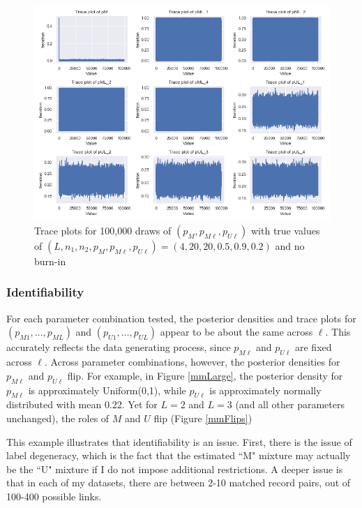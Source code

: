 \documentclass[11pt,reqno]{amsart}
\newcommand\params{(p_M, p_{M\ell}, p_{U\ell})}
\newcommand\longparam{(L,n_1,n_2, p_M,p_{M\ell},p_{U\ell})}
\begin{document}
\begin{figure}[h!]
\begin{center}
\includegraphics[width=\textwidth]{../Figures/mm/nM10/allTrace_nM10_L4.png}
\caption{Trace plots for 100,000 draws of $\params$ with true values of $\longparam = (4,20,20,0.5,0.9,0.2)$ and no burn-in}
\label{mmConverge}
\end{center}
\end{figure}

\subsubsection{Identifiability} For each parameter combination tested, the posterior densities and trace plots for $(p_{M1}, \dots, p_{ML})$ and $(p_{U1}, \dots, p_{UL})$ appear to be about the same across $\ell$.  This accurately reflects the data generating process, since $p_{M\ell}$ and $p_{U\ell}$ are fixed across $\ell$.  Across parameter combinations, however, the posterior densities for $p_{M\ell}$ and $p_{U\ell}$ flip.  For example, in Figure \ref{mmLarge}, the posterior density for $p_{M\ell}$ is approximately Uniform(0,1), while $p_{U\ell}$ is approximately normally distributed with mean 0.22.  Yet for $L=2$ and $L=3$ (and all other parameters unchanged), the roles of $M$ and $U$ flip (Figure \ref{mmFlips})

This example illustrates that identifiability is an issue.  First, there is the issue of label degeneracy, which is the fact that the estimated ``M" mixture may actually be the ``U" mixture if I do not impose additional restrictions.  A deeper issue is that in each of my datasets, there are between 2-10 matched record pairs, out of 100-400 possible links.  
\end{document}
